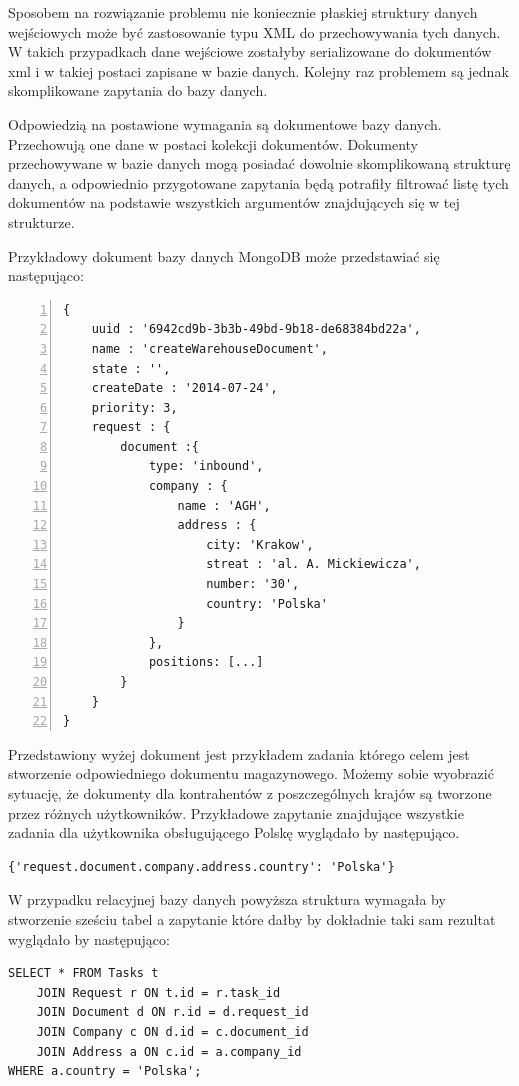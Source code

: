 Sposobem na rozwiązanie problemu nie koniecznie płaskiej struktury danych wejściowych może być zastosowanie typu XML do przechowywania tych danych. W takich przypadkach dane wejściowe zostałyby serializowane do dokumentów xml i w takiej postaci zapisane w bazie danych. Kolejny raz problemem są jednak skomplikowane zapytania do bazy danych. 

Odpowiedzią na postawione wymagania są dokumentowe bazy danych. Przechowują one dane w postaci kolekcji dokumentów. Dokumenty przechowywane w bazie danych mogą posiadać dowolnie skomplikowaną strukturę danych, a odpowiednio przygotowane zapytania będą potrafiły filtrować  listę tych dokumentów na podstawie wszystkich argumentów znajdujących się w tej strukturze. 

Przykładowy dokument bazy danych MongoDB może przedstawiać się następująco:

\begin{lstlisting}[caption=Zadanie w postaci dokumentu MongoDB.,numbers=left]
{	
	uuid : '6942cd9b-3b3b-49bd-9b18-de68384bd22a',
	name : 'createWarehouseDocument',
	state : '',
	createDate : '2014-07-24',
	priority: 3,
	request : {
		document :{
			type: 'inbound',
			company : {
				name : 'AGH',
				address : {
					city: 'Krakow',
					streat : 'al. A. Mickiewicza',
					number: '30',
					country: 'Polska'
				}
			},
			positions: [...]
		}
	}
}
\end{lstlisting}


Przedstawiony wyżej dokument jest przykładem zadania którego celem jest stworzenie odpowiedniego dokumentu magazynowego. Możemy sobie wyobrazić sytuację, że dokumenty dla kontrahentów z poszczególnych krajów są tworzone przez różnych użytkowników. Przykładowe zapytanie znajdujące wszystkie zadania dla użytkownika obsługującego Polskę wyglądało by następująco. 

\begin{lstlisting}[caption=Zapytanie MongoDB.]
{'request.document.company.address.country': 'Polska'}
\end{lstlisting}

W przypadku relacyjnej bazy danych powyższa struktura wymagała by stworzenie sześciu tabel a zapytanie które dałby by dokładnie taki sam rezultat wyglądało by następująco:

\begin{lstlisting}[caption=Zapytanie SQL.]
SELECT * FROM Tasks t 
	JOIN Request r ON t.id = r.task_id
	JOIN Document d ON r.id = d.request_id
	JOIN Company c ON d.id = c.document_id
	JOIN Address a ON c.id = a.company_id
WHERE a.country = 'Polska';
\end{lstlisting}

